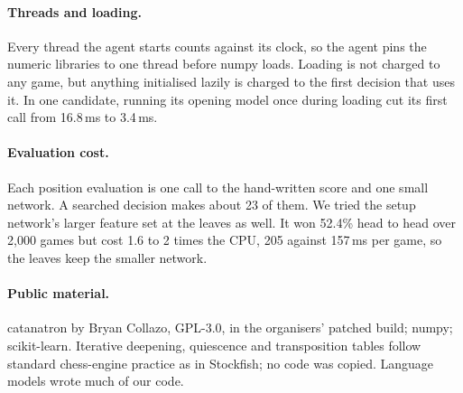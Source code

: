 \documentclass[11pt,a4paper]{article}
\begin{document}
\paragraph{Threads and loading.} Every thread the agent starts counts against its clock, so the agent pins the numeric
libraries to one thread before numpy loads. Loading is not charged to any game, but anything initialised lazily is
charged to the first decision that uses it. In one candidate, running its opening model once during loading cut its first
call from 16.8\,ms to 3.4\,ms.

\paragraph{Evaluation cost.} Each position evaluation is one call to the hand-written score and one small network.
A searched decision makes about 23 of them. We tried the setup network's larger feature set at the leaves as well. It
won 52.4\% head to head over 2,000 games but cost 1.6 to 2 times the CPU, 205 against 157\,ms per game, so the leaves
keep the smaller network.

\paragraph{Public material.} catanatron by Bryan Collazo, GPL-3.0, in the organisers' patched build; numpy;
scikit-learn. Iterative deepening, quiescence and transposition tables follow standard chess-engine practice as in
Stockfish; no code was copied. Language models wrote much of our code.
\end{document}
